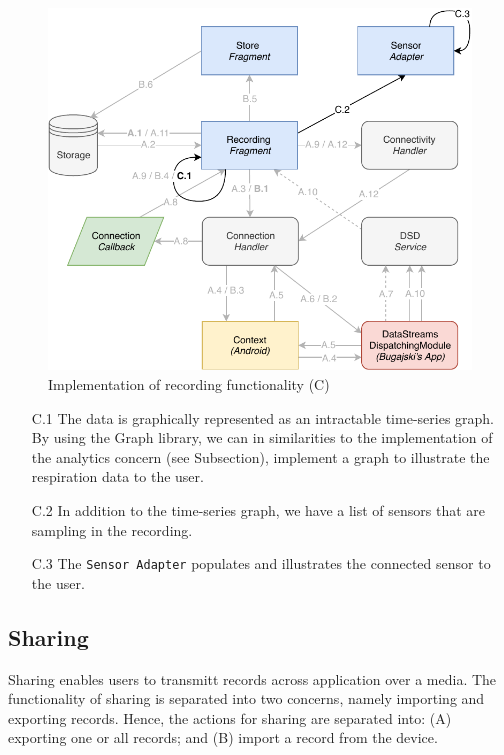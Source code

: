 \begin{figure}
    \centering
    \includegraphics[scale=0.7]{images/Recording_ImpC.pdf}
    \caption{Implementation of recording functionality (C)}
    \label{fig:impl_recordingC}
\end{figure}

\begin{itemize}
    \item[C.1] The data is graphically represented as an intractable time-series graph. By using the Graph library, we can in similarities to the implementation of the analytics concern (see Subsection), implement a graph to illustrate the respiration data to the user.
    \item[C.2] In addition to the time-series graph, we have a list of sensors that are sampling in the recording. 
    \item[C.3] The \verb|Sensor Adapter| populates and illustrates the connected sensor to the user.
\end{itemize}


\subsection{Sharing}

Sharing enables users to transmitt records across application over a media. The functionality of sharing is separated into two concerns, namely importing and exporting records. Hence, the actions for sharing are separated into: (A) exporting one or all records; and (B) import a record from the device. 


